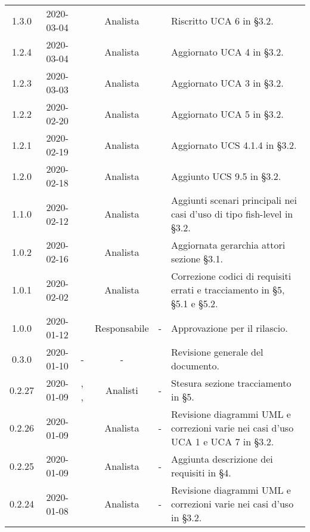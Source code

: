 {\begin{longtable}{ c c  C{2.3cm} c C{3cm} C{3.2cm}}
1.3.0 & 2020-03-04 & \DF{} & Analista & \CE{} & Riscritto UCA 6 in §3.2. \\

1.2.4 & 2020-03-04 & \DF{} & Analista & \CE{} & Aggiornato UCA 4 in §3.2. \\

1.2.3 & 2020-03-03 & \DF{} & Analista & \CE{} & Aggiornato UCA 3 in §3.2. \\

1.2.2 & 2020-02-20 & \AT{} & Analista & \DF{} & Aggiornato UCA 5 in §3.2. \\

1.2.1 & 2020-02-19 & \SE{} & Analista & \DF{} & Aggiornato UCS 4.1.4 in §3.2. \\

1.2.0 & 2020-02-18 & \DF{} & Analista & \CE{} & Aggiunto UCS 9.5 in §3.2. \\

1.1.0 & 2020-02-12 & \DF{} & Analista & \CE{} & Aggiunti scenari principali nei casi d'uso di tipo fish-level in §3.2. \\

1.0.2 & 2020-02-16 & \AT{} & Analista & \CE{} & Aggiornata gerarchia attori sezione §3.1. \\

1.0.1 & 2020-02-02 & \AT{} & Analista & \CE{} & Correzione codici di requisiti errati e tracciamento in §5, §5.1 e §5.2. \\

1.0.0 & 2020-01-12 & \AT{} & Responsabile & - & Approvazione per il rilascio. \\

0.3.0 & 2020-01-10 & - & - & \SE{} & Revisione generale del documento. \\

0.2.27 & 2020-01-09 & \CE{}, \PF{}, \DF{} & Analisti & - & Stesura sezione tracciamento in §5. \\

0.2.26 & 2020-01-09 & \PF{} & Analista & - & Revisione diagrammi UML e correzioni varie nei casi d'uso UCA 1 e UCA 7 in §3.2. \\

0.2.25 & 2020-01-09 & \CE{} & Analista & - & Aggiunta descrizione dei requisiti in §4. \\

0.2.24 & 2020-01-08 & \CE{} & Analista & - & Revisione diagrammi UML e correzioni varie nei casi d'uso in §3.2. \\


\end{longtable}}
